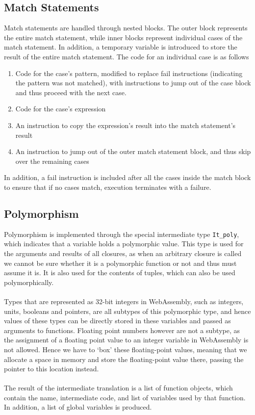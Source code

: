 \documentclass[12pt,twoside,notitlepage]{report}
\newcommand{\camlinline}{\texttt}
\begin{document}
\subsection{Match Statements}
Match statements are handled through nested blocks. The outer block represents the entire match statement, while inner blocks represent individual cases of the match statement. In addition, a temporary variable is introduced to store the result of the entire match statement. The code for an individual case is as follows
\begin{enumerate}
	\item Code for the case's pattern, modified to replace fail instructions (indicating the pattern was not matched), with instructions to jump out of the case block and thus proceed with the next case.
	\item Code for the case's expression
	\item An instruction to copy the expression's result into the match statement's result
	\item An instruction to jump out of the outer match statement block, and thus skip over the remaining cases
\end{enumerate}
In addition, a fail instruction is included after all the cases inside the match block to ensure that if no cases match, execution terminates with a failure.

\subsection{Polymorphism}
Polymorphism is implemented through the special intermediate type \camlinline{It_poly}, which indicates that a variable holds a polymorphic value. This type is used for the arguments and results of all closures, as when an arbitrary closure is called we cannot be sure whether it is a polymorphic function or not and thus must assume it is. It is also used for the contents of tuples, which can also be used polymorphically. 
\\\\
Types that are represented as 32-bit integers in WebAssembly, such as integers, units, booleans and pointers, are all subtypes of this polymorphic type, and hence values of these types can be directly stored in these variables and passed as arguments to functions. Floating point numbers however are not a subtype, as the assignment of a floating point value to an integer variable in WebAssembly is not allowed. Hence we have to `box' these floating-point values, meaning that we allocate a space in memory and store the floating-point value there, passing the pointer to this location instead.
\\\\
The result of the intermediate translation is a list of function objects, which contain the name, intermediate code, and list of variables used by that function. In addition, a list of global variables is produced.
\end{document}
